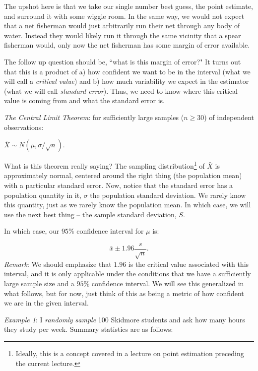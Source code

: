 \documentclass[11pt]{article}
\begin{document}
The upshot here is that we take our single number best guess, the point estimate, and surround it with some wiggle room.  In the same way, we would not expect that a net fisherman would just arbitrarily run their net through any body of water.  Instead they would likely run it through the same vicinity that a spear fisherman would, only now the net fisherman has some margin of error available.  

The follow up question should be, ``what is this margin of error?"  It turns out that this is a product of a) how confident we want to be in the interval (what we will call a \textit{critical value}) and b) how much variability we expect in the estimator (what we will call \textit{standard error}).  Thus, we need to know where this critical value is coming from and what the standard error is.  

\textit{The Central Limit Theorem}: for sufficiently large samples ($n\geq 30$) of independent observations: 

\begin{center} 
$\bar{X} \sim N(\mu, \sigma/\sqrt{n})$.
\end{center}
What is this theorem really saying?  The sampling distribution\footnote{Ideally, this is a concept covered in a lecture on point estimation preceding the current lecture.} of $\bar{X}$ is approximately normal, centered around the right thing (the population mean) with a particular standard error.  Now, notice that the standard error has a population quantity in it, $\sigma$ the population standard deviation.  We rarely know this quantity, just as we rarely know the population mean.  In which case, we will use the next best thing -- the sample standard deviation, $S$.  

In which case, our $95\%$ confidence interval for $\mu$ is:

\begin{equation} 
\bar{x} \pm 1.96\frac{s}{\sqrt{n}}.
\end{equation} 
\textit{Remark}: We should emphasize that $1.96$ is the critical value associated with this interval, and it is only applicable under the conditions that we have a sufficiently large sample size and a $95\%$ confidence interval.  We will see this generalized in what follows, but for now, just think of this as being a metric of how confident we are in the given interval.  

\textit{Example 1}: 
I \textit{randomly sample} 100 Skidmore students and ask how many hours they study per week.  Summary statistics are as follows: \\
\end{document}
